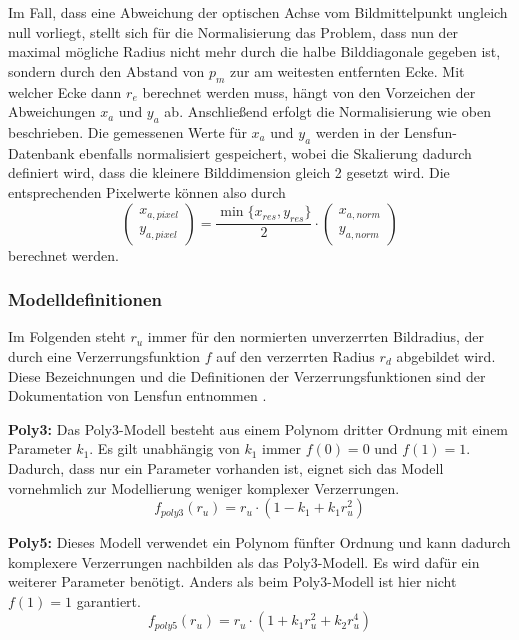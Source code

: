 Im Fall, dass eine Abweichung der optischen Achse vom Bildmittelpunkt ungleich null vorliegt, stellt sich für die Normalisierung das Problem, dass nun der maximal mögliche Radius nicht mehr durch die halbe Bilddiagonale gegeben ist, sondern durch den Abstand von $p_m$ zur am weitesten entfernten Ecke. Mit welcher Ecke dann $r_e$ berechnet werden muss, hängt von den Vorzeichen der Abweichungen $x_{a}$ und $y_{a}$ ab. Anschließend erfolgt die Normalisierung wie oben beschrieben. Die gemessenen Werte für $x_{a}$ und $y_{a}$ werden in der Lensfun-Datenbank ebenfalls normalisiert gespeichert, wobei die Skalierung dadurch definiert wird, dass die kleinere Bilddimension gleich 2 gesetzt wird. Die entsprechenden Pixelwerte können also durch
\begin{equation}
\begin{pmatrix}
x_{a,pixel} \\ y_{a,pixel}
\end{pmatrix}
 = \frac{\min\{x_{res}, y_{res}\}}{2} \cdot
 \begin{pmatrix}
 x_{a,norm} \\ y_{a,norm}
 \end{pmatrix}
\end{equation} 
berechnet werden.

\newpage
\subsubsection{Modelldefinitionen}\label{sec:Modeldefinitions}
\label{subsubsec:modeldef}

Im Folgenden steht $r_u$ immer für den normierten unverzerrten Bildradius, der durch eine Verzerrungsfunktion $f$ auf den verzerrten Radius $r_d$ abgebildet wird. Diese Bezeichnungen und die Definitionen der Verzerrungsfunktionen sind der Dokumentation von Lensfun entnommen \cite{lensfun}.

\textbf{Poly3:} Das Poly3-Modell besteht aus einem Polynom dritter Ordnung mit einem Parameter $k_1$. Es gilt unabhängig von $k_1$ immer $f(0) = 0$ und $f(1) = 1$. Dadurch, dass nur ein Parameter vorhanden ist, eignet sich das Modell vornehmlich zur Modellierung weniger komplexer Verzerrungen.
\begin{equation}
	f_{poly3}(r_u) = r_u \cdot (1 - k_1 + k_1 r_u^2)
\end{equation}

\textbf{Poly5:} Dieses Modell verwendet ein Polynom fünfter Ordnung und kann dadurch komplexere Verzerrungen nachbilden als das Poly3-Modell. Es wird dafür ein weiterer Parameter benötigt. Anders als beim Poly3-Modell ist hier nicht $f(1) = 1$ garantiert.
\begin{equation}
	f_{poly5}(r_u) = r_u \cdot (1 + k_1 r_u^2 + k_2 r_u^4)
\end{equation}

